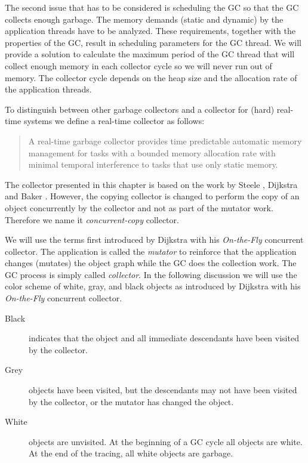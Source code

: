 The second issue that has to be considered is scheduling the GC so
that the GC collects enough garbage. The memory demands (static and
dynamic) by the application threads have to be analyzed. These
requirements, together with the properties of the GC, result in
scheduling parameters for the GC thread. We will provide a solution
to calculate the maximum period of the GC thread that will collect
enough memory in each collector cycle so we will never run out of
memory. The collector cycle depends on the heap size and the
allocation rate of the application threads.

To distinguish between other garbage collectors and a collector for
(hard) real-time systems we define a real-time collector as follows:

\begin{quote}
    A real-time garbage collector provides time predictable
    automatic memory management for tasks with a bounded memory
    allocation rate with minimal temporal interference to tasks
    that use only static memory.
\end{quote}


The collector presented in this chapter is based on the work by
Steele \cite{gc:steele75},  Dijkstra \cite{gc:dijkstra78} and Baker
\cite{gc:baker78}. However, the copying collector is changed to
perform the copy of an object concurrently by the collector and not
as part of the mutator work. Therefore we name it
\emph{concurrent-copy} collector.

We will use the terms first introduced by Dijkstra with his
\emph{On-the-Fly} concurrent collector. The application is called the
\emph{mutator} to reinforce that the application changes (mutates)
the object graph while the GC does the collection work. The GC
process is simply called \emph{collector}. In the following
discussion we will use the color scheme of white, gray, and black
objects as introduced by Dijkstra with his \emph{On-the-Fly}
concurrent collector.

\begin{description}
    \item[Black] indicates that the object and all immediate
    descendants have been visited by the collector.
    \item[Grey] objects have been visited, but the descendants may
    not have been visited by the collector, or the mutator has
    changed the object.
    \item[White] objects are unvisited. At the beginning of a GC
        cycle all objects are white. At the end of the tracing,
        all white objects are garbage.
\end{description}

